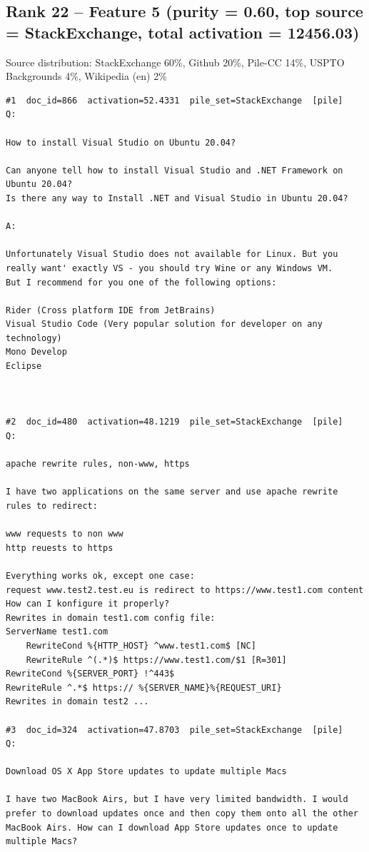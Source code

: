 \subsection*{Rank 22 -- Feature 5 (purity = 0.60, top source = StackExchange, total activation = 12456.03)}

Source distribution: StackExchange 60\%, Github 20\%, Pile-CC 14\%, USPTO Backgrounds 4\%, Wikipedia (en) 2\%

\begin{verbatim}
#1  doc_id=866  activation=52.4331  pile_set=StackExchange  [pile]
Q:

How to install Visual Studio on Ubuntu 20.04?

Can anyone tell how to install Visual Studio and .NET Framework on Ubuntu 20.04?
Is there any way to Install .NET and Visual Studio in Ubuntu 20.04?

A:

Unfortunately Visual Studio does not available for Linux. But you really want' exactly VS - you should try Wine or any Windows VM.
But I recommend for you one of the following options:

Rider (Cross platform IDE from JetBrains)
Visual Studio Code (Very popular solution for developer on any technology)
Mono Develop
Eclipse



#2  doc_id=480  activation=48.1219  pile_set=StackExchange  [pile]
Q:

apache rewrite rules, non-www, https

I have two applications on the same server and use apache rewrite rules to redirect:

www requests to non www
http reuests to https

Everything works ok, except one case:
request www.test2.test.eu is redirect to https://www.test1.com content
How can I konfigure it properly?
Rewrites in domain test1.com config file: 
ServerName test1.com
    RewriteCond %{HTTP_HOST} ^www.test1.com$ [NC]
    RewriteRule ^(.*)$ https://www.test1.com/$1 [R=301]
RewriteCond %{SERVER_PORT} !^443$
RewriteRule ^.*$ https:// %{SERVER_NAME}%{REQUEST_URI}
Rewrites in domain test2 ...

#3  doc_id=324  activation=47.8703  pile_set=StackExchange  [pile]
Q:

Download OS X App Store updates to update multiple Macs

I have two MacBook Airs, but I have very limited bandwidth. I would prefer to download updates once and then copy them onto all the other MacBook Airs. How can I download App Store updates once to update multiple Macs?


\end{verbatim}
